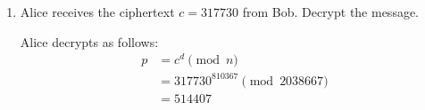 \begin{problem}
\begin{enumerate}
\begin{Answer}
\begin{multicols*}{2}
      \begin{align*}
        1 &\equiv 5 - 4 \\
        1 &\equiv 5 - (49 - 9 \cdot 5) \\
        1 &\equiv 10 \cdot 5 - 49 \\
        1 &\equiv 10 (54 - 49) - 49 \\
        1 &\equiv 10 \cdot 54 - 11 \cdot 49\\
        1 &\equiv 10 \cdot 54 - 11 (103 - 54) \\
        1 &\equiv 21 \cdot 54 - 11 \cdot 103 \\
        1 &\equiv 21 (\crim{1017900} - 9882 \cdot 103) - 11 \cdot 103 \\
        1 &\equiv -(21 \cdot 9882 + 11) \cdot 103 \\
        1 &\equiv -207533 \cdot 103 \\
        1 &\equiv 810367 \cdot 103 \\
        103^{-1} &\equiv 810367  \pmod {1017900} \\
        &\Downarrow\\
        d &= 810367
      \end{align*}

    \end{multicols*}
  \end{Answer}
\pagebreak
\item Alice receives the ciphertext $c=317730$ from Bob.
Decrypt the message.
  \begin{Answer}
    Alice decrypts as follows:
    \begin{align*}
      p &= c^d \pmod{n}\\
        &= 317730^{810367} \pmod{2038667} \\
        &= 514407
    \end{align*}
  \end{Answer}
\end{enumerate}
\end{problem}
